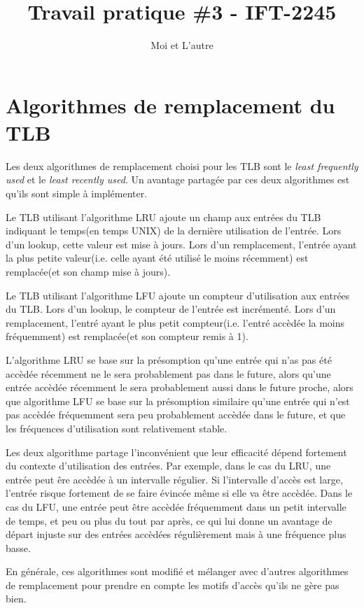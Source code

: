 \documentclass{article}
\title{Travail pratique \#3 - IFT-2245}
\author{Moi et L'autre}
\begin{document}
\maketitle

\section{Algorithmes de remplacement du TLB}
Les deux algorithmes de remplacement choisi pour les TLB sont le \emph{least frequently used} et le \emph{least recently used}.
Un avantage partagée par ces deux algorithmes est qu'ils sont simple à implémenter.

Le TLB utilisant l'algorithme LRU ajoute un champ  aux entrées du TLB indiquant le temps(en temps UNIX) de la dernière utilisation de l'entrée. Lors d'un lookup, cette valeur est mise à jours. Lors d'un remplacement, l'entrée ayant la plus petite valeur(i.e. celle ayant été utilisé le moins récemment) est remplacée(et son champ  mise à jours).

Le TLB utilisant l'algorithme LFU ajoute un compteur d'utilisation aux entrées du TLB. Lors d'un lookup, le compteur de l'entrée est incrémenté. Lors d'un remplacement, l'entré ayant le plus petit compteur(i.e. l'entré accèdée la moins fréquemment) est remplacée(et son compteur remis à 1).

L'algorithme LRU se base sur la présomption qu'une entrée qui n'as pas été accèdée récemment ne le sera probablement pas dans le future, alors qu'une entrée accèdée récemment le sera probablement aussi dans le future proche, alors que algorithme LFU se base sur la présomption similaire qu'une entrée qui n'est pas accèdée fréquemment sera peu probablement accèdée dans le future, et que les fréquences d'utilisation sont relativement stable.

Les deux algorithme partage l'inconvénient que leur efficacité dépend fortement du contexte d'utilisation des entrées. Par exemple, dans le cas du LRU, une entrée peut êre accèdée à un intervalle régulier. Si l'intervalle d'accès est large, l'entrée risque fortement de se faire évincée même si elle va être accèdée.
Dans le cas du LFU, une entrée peut être accèdée fréquemment dans un petit intervalle de temps, et peu ou plus du tout par après, ce qui lui donne un avantage de départ injuste sur des entrées accèdées régulièrement mais à une fréquence plus basse.

En générale, ces algorithmes sont modifié et mélanger avec d'autres algorithmes de remplacement pour prendre en compte les motifs d'accès qu'ils ne gère pas bien.
\end{document}

